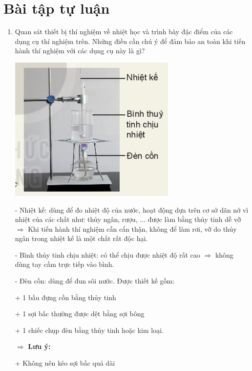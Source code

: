 \section{Bài tập tự luận}
\setcounter{section}{0}

\begin{enumerate}[label=\bfseries Câu \arabic*:,leftmargin=1.5cm]
	\item {}
	
	
	{ 
		
		Quan sát thiết bị thí nghiệm về nhiệt học và trình bày đặc điểm của các dụng cụ thí nghiệm trên. Những điều cần chú ý để đảm bảo an toàn khi tiến hành thí nghiệm với các dụng cụ này là gì?
		\begin{center}
			\includegraphics[scale=0.6]{../figs/VN10-2022-PH-TP003-3.jpg}
		\end{center}
	}
	
	\hideall
	{
		- Nhiệt kế: dùng để đo nhiệt độ của nước, hoạt động dựa trên cơ sở dãn nở vì nhiệt của các chất như: thủy ngân, rượu, ... được làm bằng thủy tinh dễ vỡ $\Rightarrow$ Khi tiến hành thí nghiệm cần cẩn thận, không để làm rơi, vỡ do thủy ngân trong nhiệt kế là một chất rất độc hại.
		
		- Bình thủy tinh chịu nhiệt: có thể chịu được nhiệt độ rất cao $\Rightarrow$ không dùng tay cầm trực tiếp vào bình.
		
		- Đèn cồn: dùng để đun sôi nước. Được thiết kế gồm:
		
		+ 1 bầu đựng cồn bằng thủy tinh
		
		+ 1 sợi bấc thường được dệt bằng sợi bông
		
		+ 1 chiếc chụp đèn bằng thủy tinh hoặc kim loại.
		
		$\Rightarrow$ \textbf{Lưu ý:}
		
		+ Không nên kéo sợi bấc quá dài
		
}
\end{enumerate}
